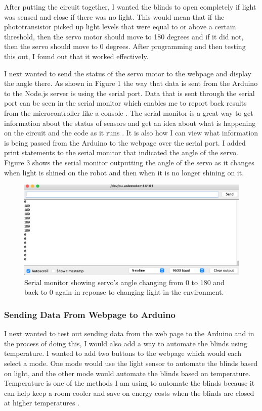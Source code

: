\documentclass[10pt,twocolumn]{article}
\begin{document}
After putting the circuit together, I wanted the blinds to open completely if light was sensed and close if there was no light. This would mean that if the phototransistor picked up light levels that were equal to or above a certain threshold, then the servo motor should move to 180 degrees and if it did not, then the servo should move to 0 degrees. After programming and then testing this out, I found out that it worked effectively. 

I next wanted to send the status of the servo motor to the webpage and display the angle there. As shown in Figure 1 the way that data is sent from the Arduino to the Node.js server is using the serial port. Data that is sent through the serial port can be seen in the serial monitor which enables me to report back results from the microcontroller like a console \cite{Fitzgerald2015Arduino}. The serial monitor is a great way to get information about the status of sensors and get an idea about what is happening on the circuit and the code as it runs \cite{Fitzgerald2015Arduino}. It is also how I can view what information is being passed from the Arduino to the webpage over the serial port. I added print statements to the serial monitor that indicated the angle of the servo. Figure 3 shows the serial monitor outputting the angle of the servo as it changes when light is shined on the robot and then when it is no longer shining on it. 

\begin{figure}
    \centering
    \includegraphics[width=.95\linewidth]{Figure 3.png}
    \caption{
        Serial monitor showing servo's angle changing from 0 to 180 and back to 0 again in reponse to changing light in the environment.
    }
    \label{fig:fig3}
\end{figure}

\subsubsection*{Sending Data From Webpage to Arduino}
I next wanted to test out sending data from the web page to the Arduino and in the process of doing this, I would also add a way to automate the blinds using temperature. I wanted to add two buttons to the webpage which would each select a mode. One mode would use the light sensor to automate the blinds based on light, and the other mode would automate the blinds based on temperature. Temperature is one of the methods I am using to automate the blinds because it can help keep a room cooler and save on energy costs when the blinds are closed at higher temperatures \cite{Jang2014ToStayCool}.
\end{document}
